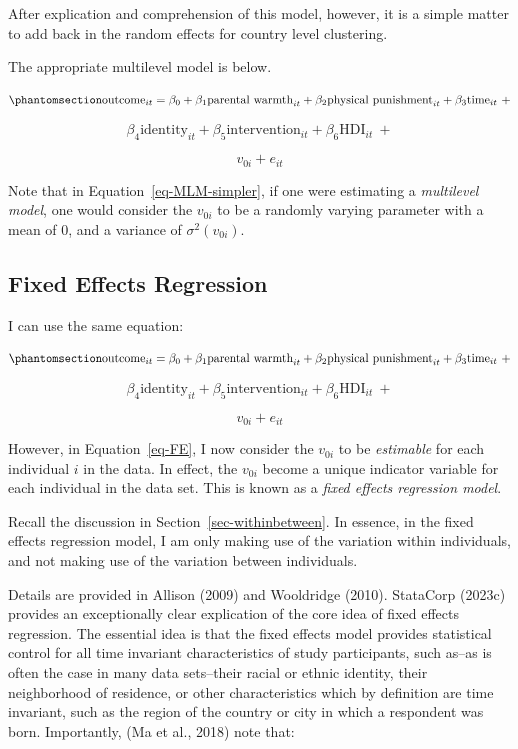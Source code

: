 \documentclass[
  letterpaper,
  DIV=11,
  numbers=noendperiod]{scrreprt}
\begin{document}
After explication and comprehension of this model, however, it is a
simple matter to add back in the random effects for country level
clustering.

The appropriate multilevel model is below.

\begin{equation}\phantomsection\label{eq-MLM-simpler}{\text{outcome}_{it} = \beta_0 + \beta_1 \text{parental warmth}_{it} + \beta_2 \text{physical punishment}_{it} + \beta_3 \text{time}_{it} \ + }\end{equation}

\[\beta_4 \text{identity}_{it} + \beta_5 \text{intervention}_{it} + \beta_6 \text{HDI}_{it} \ +\]

\[v_{0i} + e_{it}\]

Note that in Equation~\ref{eq-MLM-simpler}, if one were estimating a
\emph{multilevel model}, one would consider the \(v_{0i}\) to be a
randomly varying parameter with a mean of 0, and a variance of
\(\sigma^2(v_{0i})\).

\subsection{Fixed Effects Regression}\label{fixed-effects-regression}

I can use the same equation:

\begin{equation}\phantomsection\label{eq-FE}{\text{outcome}_{it} = \beta_0 + \beta_1 \text{parental warmth}_{it} + \beta_2 \text{physical punishment}_{it} + \beta_3 \text{time}_{it} \ + }\end{equation}

\[\beta_4 \text{identity}_{it} + \beta_5 \text{intervention}_{it} + \beta_6 \text{HDI}_{it} \ +\]

\[v_{0i} + e_{it}\]

However, in Equation~\ref{eq-FE}, I now consider the \(v_{0i}\) to be
\emph{estimable} for each individual \(i\) in the data. In effect, the
\(v_{0i}\) become a unique indicator variable for each individual in the
data set. This is known as a \emph{fixed effects regression model}.

Recall the discussion in Section~\ref{sec-withinbetween}. In essence, in
the fixed effects regression model, I am only making use of the
variation within individuals, and not making use of the variation
between individuals.

Details are provided in Allison (2009) and Wooldridge (2010). StataCorp
(2023c) provides an exceptionally clear explication of the core idea of
fixed effects regression. The essential idea is that the fixed effects
model provides statistical control for all time invariant
characteristics of study participants, such as--as is often the case in
many data sets--their racial or ethnic identity, their neighborhood of
residence, or other characteristics which by definition are time
invariant, such as the region of the country or city in which a
respondent was born. Importantly, (Ma et al., 2018) note that:
\end{document}
